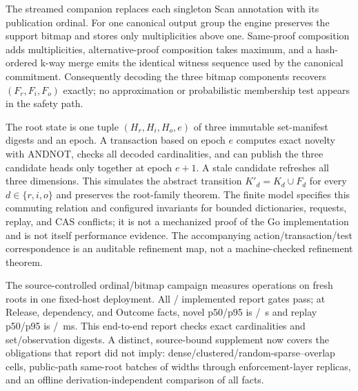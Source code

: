 \documentclass[journal,onecolumn]{IEEEtran}
\newcommand{\code}[1]{\texttt{\detokenize{#1}}}
\begin{document}
The streamed companion replaces each singleton Scan annotation with its
publication ordinal. For one canonical output group the engine preserves the
support bitmap and stores only multiplicities above one. Same-proof
composition adds multiplicities, alternative-proof composition takes maximum,
and a hash-ordered k-way merge emits the identical witness sequence used by the
canonical commitment. Consequently decoding the three bitmap components
recovers $(F_r,F_i,F_o)$ exactly; no approximation or probabilistic membership
test appears in the safety path.

The root state is one tuple $(H_r,H_i,H_o,e)$ of three immutable set-manifest
digests and an epoch. A transaction based on epoch $e$ computes exact novelty
with ANDNOT, checks all decoded cardinalities, and can publish the three
candidate heads only together at epoch $e+1$. A stale candidate refreshes all
three dimensions. This simulates the abstract transition
$K'_d=K_d\cup F_d$ for every $d\in\{r,i,o\}$ and preserves the root-family
theorem. The finite model \code{ExposureBitmapRefinement.tla} specifies this
commuting relation and configured invariants for bounded dictionaries,
requests, replay, and CAS conflicts; it is not a mechanized proof of the Go
implementation and is not itself performance evidence. The accompanying
action/transaction/test correspondence is an auditable refinement map, not a
machine-checked refinement theorem.

The source-controlled ordinal/bitmap campaign measures
\RQFourVFourSamples{} operations on \RQFourVFourRoots{} fresh roots in one
fixed-host deployment. All
\RQFourVFourGatesPassed{}/\RQFourVFourGatesTotal{} implemented report gates
pass; at \RQFourVFourReleaseFacts{} Release,
\RQFourVFourInfluenceFacts{} dependency, and \RQFourVFourOutcomeFacts{} Outcome
facts, novel p50/p95 is
\RQFourVFourNovelMedianS{}/\RQFourVFourNovelTailS{}~s and replay p50/p95 is
\RQFourVFourReplayMedianMS{}/\RQFourVFourReplayTailMS{}~ms. This end-to-end report
checks exact cardinalities and set/observation digests. A distinct,
source-bound supplement now covers the obligations that report did not imply:
\RQFourVFourDistributionCells{} dense/clustered/random-sparse--overlap cells,
public-path same-root batches of widths \RQFourVFourConcurrencyWidths{} through
\RQFourVFourConcurrencyGateways{} enforcement-layer replicas, and an offline
derivation-independent comparison of all \RQFourVFourOracleFacts{} facts.
\end{document}
